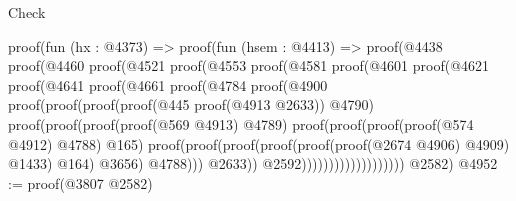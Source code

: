 \begin{lexlean}{Check}
\begin{coremodule}
                    proof(fun (hx : @4373) =>
                      proof(fun (hsem : @4413) =>
                        proof(@4438
                            proof(@4460
                                proof(@4521
                                    proof(@4553
                                        proof(@4581
                                            proof(@4601
                                                proof(@4621
                                                    proof(@4641
                                                        proof(@4661
                                                            proof(@4784
                                                                proof(@4900
                                                                    proof(proof(proof(proof(@445
                                                                              proof(@4913 @2633))
                                                                            @4790)
                                                                          proof(proof(proof(proof(@569
                                                                                    @4913)
                                                                                  @4789)
                                                                                proof(proof(proof(proof(@574
                                                                                          @4912)
                                                                                        @4788)
                                                                                      @165)
                                                                                    proof(proof(proof(proof(proof(proof(@2674
                                                                                                  @4906)
                                                                                                @4909)
                                                                                              @1433)
                                                                                            @164)
                                                                                          @3656)
                                                                                        @4788)))
                                                                              @2633))
                                                                        @2592)))))))))))))))))))
      @2582)
@4952 := proof(@3807 @2582)

\end{coremodule}
\end{lexlean}
